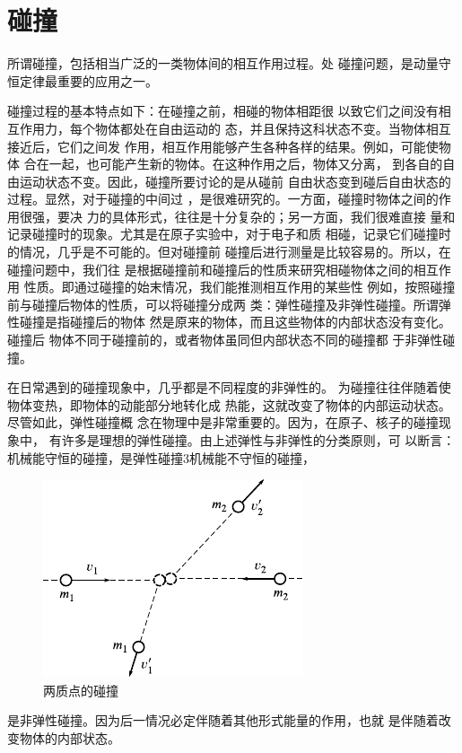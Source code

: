 \section[碰撞]{碰\hspace{3em}撞}\label{sec:08.03}

所谓碰撞，包括相当广泛的一类物体间的相互作用过程。处
碰撞问题，是动量守恒定律最重要的应用之一。

碰撞过程的基本特点如下：在碰撞之前，相碰的物体相距很
以致它们之间没有相互作用力，每个物体都处在自由运动的
态，并且保持这科状态不变。当物体相互接近后，它们之间发
作用，相互作用能够产生各种各样的结果。例如，可能使物体
合在一起，也可能产生新的物体。在这种作用之后，物体又分离，
到各自的自由运动状态不变。因此，碰撞所要讨论的是从碰前
自由状态变到碰后自由状态的过程。显然，对于碰撞的中间过
，是很难研究的。一方面，碰撞时物体之间的作用很强，要决
力的具体形式，往往是十分复杂的；另一方面，我们很难直接
量和记录碰撞时的现象。尤其是在原子实验中，对于电子和质
相碰，记录它们碰撞时的情况，几乎是不可能的。但对碰撞前
碰撞后进行测量是比较容易的。所以，在碰撞问题中，我们往
是根据碰撞前和碰撞后的性质来研究相碰物体之间的相互作用
性质。即通过碰撞的始末情况，我们能推测相互作用的某些性
例如，按照碰撞前与碰撞后物体的性质，可以将碰撞分成两
类：弹性碰撞及非弹性碰撞。所谓弹性碰撞是指碰撞后的物体
然是原来的物体，而且这些物体的内部状态没有变化。碰撞后
物体不同于碰撞前的，或者物体虽同但内部状态不同的碰撞都
于非弹性碰撞。

在日常遇到的碰撞现象中，几乎都是不同程度的非弹性的。
为碰撞往往伴随着使物体变热，即物体的动能部分地转化成
热能，这就改变了物体的内部运动状态。尽管如此，弹性碰撞概
念在物理中是非常重要的。因为，在原子、核子的碰撞现象中，
有许多是理想的弹性碰撞。由上述弹性与非弹性的分类原则，可
以断言：机械能守恒的碰撞，是弹性碰撞3机械能不守恒的碰撞，
\begin{figure}
  \centering
  \includegraphics{figure/fig08.05}
  \caption{两质点的碰撞}
  \label{fig:08.05}
\end{figure}
是非弹性碰撞。因为后一情况必定伴随着其他形式能量的作用，也就
是伴随着改变物体的内部状态。

